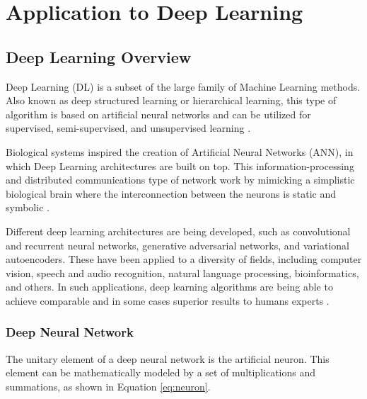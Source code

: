 
\chapter{Application to Deep Learning}
\label{chapter:application}

\section{Deep Learning Overview}

Deep Learning (DL) is a subset of the large family of Machine Learning methods. Also known as deep structured learning or hierarchical learning, this type of algorithm is based on artificial neural networks and can be utilized for supervised, semi-supervised, and unsupervised learning \cite{bengio_representation_2013} \cite{schmidhuber_deep_2015}.

Biological systems inspired the creation of Artificial Neural Networks (ANN), in which Deep Learning architectures are built on top. This information-processing and distributed communications type of network work by mimicking a simplistic biological brain where the interconnection between the neurons is static and symbolic \cite{marblestone_toward_2016}. 

Different deep learning architectures are being developed, such as convolutional and recurrent neural networks, generative adversarial networks, and variational autoencoders. These have been applied to a diversity of fields, including computer vision, speech and audio recognition, natural language processing, bioinformatics, and others. In such applications, deep learning algorithms are being able to achieve comparable and in some cases superior results to humans experts \cite{noauthor_googles_nodate}.

\subsection{Deep Neural Network}
The unitary element of a deep neural network is the artificial neuron. This element can be mathematically modeled by a set of multiplications and summations, as shown in Equation \ref{eq:neuron}.

